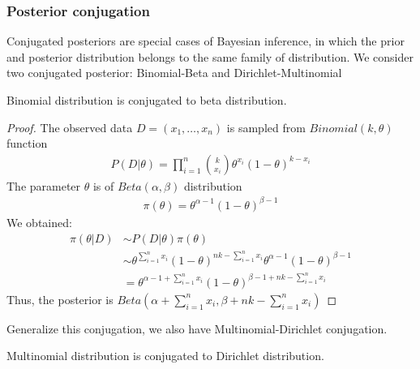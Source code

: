 \subsubsection{Posterior conjugation}
Conjugated posteriors are special cases of Bayesian inference, in which the
prior and posterior distribution belongs to the same family of distribution.
We consider two conjugated posterior: Binomial-Beta and Dirichlet-Multinomial
\begin{lemma}
    Binomial distribution is conjugated to beta distribution.
\end{lemma}
\begin{proof}
    The observed data $D=(x_1,\ldots,x_n)$ is sampled from $Binomial(k, \theta)$ function
    \begin{align*}
        P(D|\theta) = \prod_{i=1}^n{k\choose x_i}\theta^{x_i}(1-\theta)^{k-x_i}
    \end{align*}
    The parameter $\theta$ is of $Beta(\alpha, \beta)$ distribution
    \begin{align*}
        \pi(\theta) = \theta^{\alpha-1}(1-\theta)^{\beta -1}
    \end{align*}
    We obtained:
    \begin{align*}
        \pi(\theta|D) & \sim P(D|\theta)\pi(\theta)                                                                             \\
                      & \sim \theta^{\sum_{i=1}^n x_i}(1-\theta)^{nk -\sum_{i=1}^n x_i} \theta^{\alpha -1} (1-\theta)^{\beta-1} \\
                      & = \theta^{\alpha - 1 + \sum_{i=1}^n x_i}(1-\theta)^{\beta - 1 + nk -\sum_{i=1}^n x_i}
    \end{align*}
    Thus, the posterior is $Beta(\alpha + \sum_{i=1}^n x_i, \beta + nk -\sum_{i=1}^n x_i)$
\end{proof}
Generalize this conjugation, we also have Multinomial-Dirichlet conjugation.
\begin{lemma}
    Multinomial distribution is conjugated to Dirichlet distribution.
\end{lemma}
